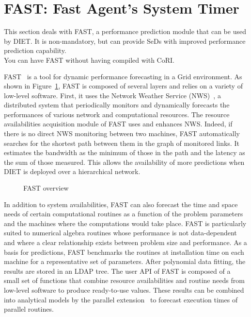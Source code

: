 \section{FAST: Fast Agent's System Timer}
\label{sec:FAST}

This section deals with FAST, a performance prediction module that
can be used by DIET. It is non-mandatory, but can provide SeDs with
improved performance prediction capability.\\
You can have FAST without having compiled with CoRI.

FAST~\cite{Qui02} is a tool for dynamic performance forecasting in a
Grid environment. As shown in Figure~\ref{fig:fast-overview}, FAST
is composed of several layers and relies on a variety of low-level
software. First, it uses the Network Weather Service
(NWS)~\cite{WSH99}, a distributed system that periodically monitors
and dynamically forecasts the performances of various network and
computational resources. The resource availabilities acquisition
module of FAST uses and enhances NWS. Indeed, if there is no direct
NWS monitoring between two machines, FAST automatically searches for
the shortest path between them in the graph of monitored links. It
estimates the bandwidth as the minimum of those in the path and the
latency as the sum of those measured. This allows the
availability of more predictions when DIET is deployed over a
hierarchical network.

\begin{figure}[htb]
  \begin{center}
    \caption{FAST overview}
    \label{fig:fast-overview}
  \end{center}
\end{figure}

In addition to system availabilities, FAST can also forecast the
time and space needs of certain computational routines as a function
of the problem parameters and the machines where the computations
would take place.  FAST is particularly suited to numerical algebra
routines whose performance is not data-dependent and where a clear
relationship exists between problem size and performance. As a basis
for predictions, FAST benchmarks the routines at installation time
on each machine for a representative set of parameters. After
polynomial data fitting, the results are stored in an LDAP tree. The
user API of FAST is composed of a small set of functions that
combine resource availabilities and routine needs from low-level
software to produce ready-to-use values.  These results can be
combined into analytical models by the parallel
extension~\cite{CS02} to forecast execution times of parallel
routines.

